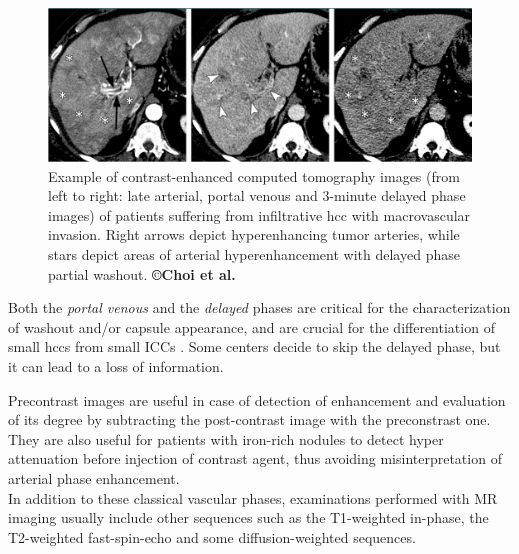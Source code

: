 \begin{figure}[th!]
\centering
\includegraphics[width=0.9\linewidth]{images/image15_crop}
\caption{Example of contrast-enhanced computed tomography images (from left to right: late arterial, portal venous and 3-minute delayed phase images) of patients suffering from infiltrative \ac{hcc} with macrovascular invasion. Right arrows depict hyperenhancing tumor arteries, while stars depict areas of arterial hyperenhancement with delayed phase partial washout. \textbf{©Choi et al. \cite{Choi2014a}}}
\label{Choi2014a_Fig3}
\end{figure}

Both the \emph{portal venous} and the \emph{delayed} phases are critical
for the characterization of washout and/or capsule appearance, and are
crucial for the differentiation of small \ac{hcc}s from small
ICCs \cite{Iannaccone2005,Rimola2009}. Some centers decide
to skip the delayed phase, but it can lead to a loss of information.

Precontrast images are useful in case of detection of enhancement
and evaluation of its degree by subtracting the post-contrast image with
the preconstrast one. They are also useful for patients with iron-rich
nodules to detect hyper attenuation before injection of contrast agent,
thus avoiding misinterpretation of arterial phase enhancement.\\
In addition to these classical vascular phases, examinations performed
with MR imaging usually include other sequences such as the T1-weighted
in-phase, the T2-weighted fast-spin-echo and some diffusion-weighted
sequences.\\




